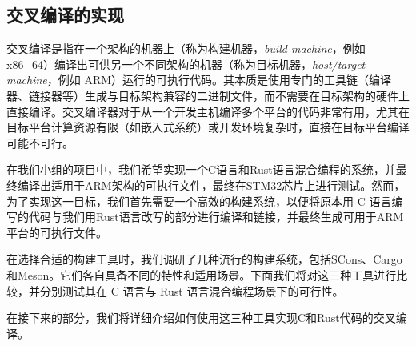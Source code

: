 
\subsection{交叉编译的实现}
\indent 交叉编译\cite{Cross_compiler}是指在一个架构的机器上（称为构建机器，\textit{build machine}，例如 x86_64）编译出可供另一个不同架构的机器（称为目标机器，\textit{host/target machine}，例如 ARM）运行的可执行代码。其本质是使用专门的工具链（编译器、链接器等）生成与目标架构兼容的二进制文件，而不需要在目标架构的硬件上直接编译。交叉编译器对于从一个开发主机编译多个平台的代码非常有用，尤其在目标平台计算资源有限（如嵌入式系统）或开发环境复杂时，直接在目标平台编译可能不可行。

\indent 在我们小组的项目中，我们希望实现一个C语言和Rust语言混合编程的系统，并最终编译出适用于ARM架构的可执行文件，最终在STM32芯片上进行测试。然而，为了实现这一目标，我们首先需要一个高效的构建系统，以便将原本用 C 语言编写的代码与我们用Rust语言改写的部分进行编译和链接，并最终生成可用于ARM平台的可执行文件。

\indent 在选择合适的构建工具时，我们调研了几种流行的构建系统\cite{comparison}，包括SCons、Cargo和Meson。它们各自具备不同的特性和适用场景。下面我们将对这三种工具进行比较，并分别测试其在 C 语言与 Rust 语言混合编程场景下的可行性。

\indent 在接下来的部分，我们将详细介绍如何使用这三种工具实现C和Rust代码的交叉编译。